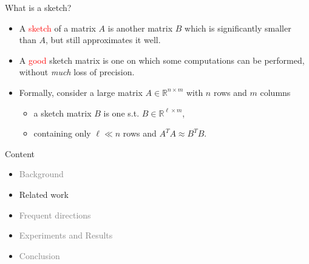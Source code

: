 \documentclass[first=dgreen,second=purple,logo=redque]{aaltoslides}
\begin{document}

\begin{frame}{What is a sketch?}
\begin{itemize}
  \item A \textcolor{red}{sketch} of a matrix $A$ is another matrix $B$ which is significantly
  \textcolor{dgreen}{smaller} than $A$, but still approximates it \textcolor{dgreen}{well}.
  \item A \textcolor{red}{good} sketch matrix is one on which some computations can
  be performed, \textcolor{dgreen}{without} \textit{much} loss of precision.
  \item Formally, consider a large matrix $A \in \mathbb{R}^{n\times m}$ with $n$ rows and $m$
columns
	\begin{itemize}
		\item a sketch matrix $B$ is one s.t. $B \in \mathbb{R}^{\ell \times m}$,
		\item containing only $\ell \ll n$ rows and $A^TA \approx B^TB$.
	\end{itemize}
\end{itemize}
\end{frame}




\begin{frame}{Content}
\begin{itemize}
\item \textcolor{gray}{Background}
\item Related work
\item \textcolor{gray}{Frequent directions}
\item \textcolor{gray}{Experiments and Results}
\item \textcolor{gray}{Conclusion}
\end{itemize}
\end{frame}
\end{document}
